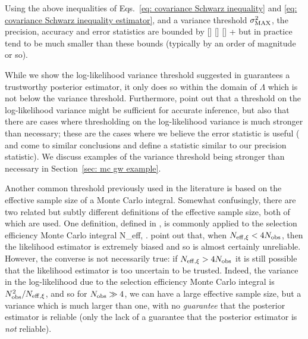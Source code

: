 Using the above inequalities of Eqs.~\ref{eq: covariance Schwarz inequality} and \ref{eq: covariance Schwarz inequality estimator}, and a variance threshold $\sigma^2_{\rm MAX}$, the precision, accuracy and error statistics are bounded by 
\beq
\hat{\Pi}[] \le {} \qquad \qquad {}[] \le {} \qquad \qquad {}[] \le {} +  
\label{eq: error statistics bounds}
\eeq
but in practice tend to be much smaller than these bounds (typically by an order of magnitude or so).

While we show the log-likelihood variance threshold suggested in \citet{Talbot:2023pex} guarantees a trustworthy posterior estimator, it only does so within the domain of $\Lambda$ which is not below the variance threshold. Furthermore, \citet{Essick:2022ojx} point out that a threshold on the log-likelihood variance might be sufficient for accurate inference, but also that there are cases where thresholding on the log-likelihood variance is much stronger than necessary; these are the cases where we believe the error statistic is useful (\citet{Essick:2022ojx} and \citet{Talbot:2023pex} come to similar conclusions and define a statistic similar to our precision statistic). We discuss examples of the variance threshold being stronger than necessary in Section~\ref{sec: mc gw example}.

Another common threshold previously used in the literature is based on the effective sample size of a Monte Carlo integral. Somewhat confusingly, there are two related but subtly different definitions of the effective sample size, both of which are used. One definition, defined in \citet{Farr:2019rap}, is commonly applied to the selection efficiency Monte Carlo integral
\beq
N_{{\rm eff}, \xi} \equiv {}.
\eeq
\citet{Farr:2019rap} point out that, when $N_{{\rm eff}, \xi} < 4N_{\rm obs}$, then the likelihood estimator is extremely biased and so is almost certainly unreliable. However, the converse is not necessarily true: if $N_{{\rm eff},\xi} > 4N_{\rm obs}$ it is still possible that the likelihood estimator is too uncertain to be trusted. Indeed, the variance in the log-likelihood due to the selection efficiency Monte Carlo integral is $N_{\rm obs}^2 / N_{{\rm eff},\xi}$, and so for $N_{\rm obs} \gg 4$, we can have a large effective sample size, but a variance which is much larger than one, with no \textit{guarantee} that the posterior estimator is reliable (only the lack of a guarantee that the posterior estimator is \textit{not} reliable).


